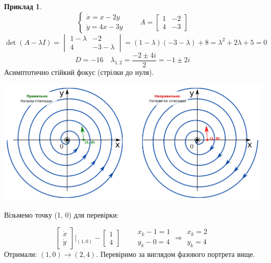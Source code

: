 \documentclass[14pt,a4paper]{scrartcl}
\theoremstyle{definition}
\newtheorem*{example}{Приклад}
\theoremstyle{definition}
\theoremstyle{definition}
\begin{document}
\begin{example}
    $$
    \begin{cases}
        \dot{x } = x - 2y\\
        \dot{y} = 4x - 3y
    \end{cases} \qquad A = \begin{bmatrix}
     1 & -2 \\
     4 & -3
    \end{bmatrix}
    $$
    $$ \det{(A - \lambda I)} = \begin{vmatrix}
      1- \lambda & -2 \\
      4 & -3-\lambda
    \end{vmatrix}  = ( 1- \lambda) (-3 - \lambda) + 8 = \lambda^2 + 2 \lambda + 5 = 0$$
$$
D = -16 \quad \lambda_{1,2} = \frac{-2 \pm 4i}{2} = -1 \pm 2i
$$
Асимптотично стійкий фокус (стрілки до нуля).
\begin{center} \includegraphics[scale=0.27]{assets/lectures_recent-b90426e3.png} \end{center}
Візьмемо точку (1, 0) для перевірки:

$$
\begin{bmatrix}
 \dot{x}\\
 \dot{y}
\end{bmatrix}\Bigg|_{(1,0)} - \begin{bmatrix}
 1 \\
 4
\end{bmatrix} \qquad \begin{gathered}
 x_k -1 = 1 \\
 y_k - 0 = 4
\end{gathered} \Rightarrow \begin{gathered}
 x_k = 2 \\
 y_k  = 4
\end{gathered}
$$
Отримали: $(1,0) \to (2, 4)$. Перевіримо за виглядом фазового портрета вище.
\end{example}
\end{document}
